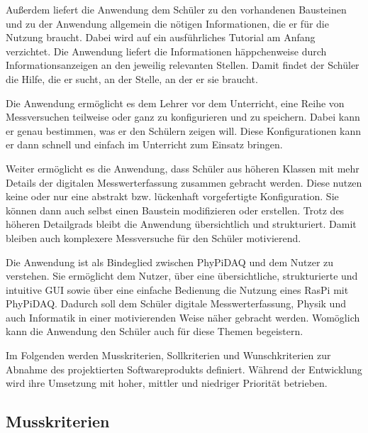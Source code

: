 \documentclass[parskip=full]{scrartcl}
\begin{document}
Außerdem liefert die Anwendung dem Schüler zu den vorhandenen Bausteinen und zu der Anwendung allgemein die nötigen Informationen, die er für die Nutzung braucht. Dabei wird auf ein ausführliches Tutorial am Anfang verzichtet. Die Anwendung liefert die Informationen häppchenweise durch Informationsanzeigen an den jeweilig relevanten Stellen. Damit findet der Schüler die Hilfe, die er sucht, an der Stelle, an der er sie braucht.

Die Anwendung ermöglicht es dem Lehrer vor dem Unterricht, eine Reihe von Messversuchen teilweise oder ganz zu konfigurieren und zu speichern. Dabei kann er genau bestimmen, was er den Schülern zeigen will. Diese Konfigurationen kann er dann schnell und einfach im Unterricht zum Einsatz bringen. 

Weiter ermöglicht es die Anwendung, dass Schüler aus höheren Klassen mit mehr Details der digitalen Messwerterfassung zusammen gebracht werden. Diese nutzen keine oder nur eine abstrakt bzw. lückenhaft vorgefertigte Konfiguration. Sie können dann auch selbst einen Baustein modifizieren oder erstellen. Trotz des höheren Detailgrads bleibt die Anwendung übersichtlich und strukturiert. Damit bleiben auch komplexere Messversuche für den Schüler motivierend. 

Die Anwendung ist als Bindeglied zwischen \gls{PhyPiDAQ} und dem Nutzer zu verstehen. Sie ermöglicht dem Nutzer, über eine übersichtliche, strukturierte und intuitive GUI sowie über eine einfache Bedienung die Nutzung eines \gls{RasPi} mit \gls{PhyPiDAQ}. Dadurch soll dem Schüler digitale Messwerterfassung, Physik und auch Informatik in einer motivierenden Weise näher gebracht werden. Womöglich kann die Anwendung den Schüler auch für diese Themen begeistern.  

Im Folgenden werden \gls{Musskriterien}, \gls{Sollkriterien} und \gls{Wunschkriterien} zur Abnahme des projektierten Softwareprodukts definiert. Während der Entwicklung wird ihre Umsetzung mit hoher, mittler und niedriger Priorität betrieben. 


\subsection{Musskriterien}
\end{document}
